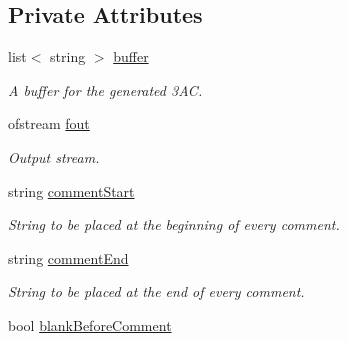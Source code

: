 \subsection*{Private Attributes}
\begin{DoxyCompactItemize}
\item 
\hypertarget{classTAC__Generator_ac81f61474c8fd2da0b4806f81719356a}{list$<$ string $>$ \hyperlink{classTAC__Generator_ac81f61474c8fd2da0b4806f81719356a}{buffer}}\label{classTAC__Generator_ac81f61474c8fd2da0b4806f81719356a}

\begin{DoxyCompactList}\small\item\em A buffer for the generated 3\-A\-C. \end{DoxyCompactList}\item 
\hypertarget{classTAC__Generator_a28ca6d057dca0033a4ae6e67b903ea7c}{ofstream \hyperlink{classTAC__Generator_a28ca6d057dca0033a4ae6e67b903ea7c}{fout}}\label{classTAC__Generator_a28ca6d057dca0033a4ae6e67b903ea7c}

\begin{DoxyCompactList}\small\item\em Output stream. \end{DoxyCompactList}\item 
\hypertarget{classTAC__Generator_ac530666b410f226e764e9eb33b2a4666}{string \hyperlink{classTAC__Generator_ac530666b410f226e764e9eb33b2a4666}{comment\-Start}}\label{classTAC__Generator_ac530666b410f226e764e9eb33b2a4666}

\begin{DoxyCompactList}\small\item\em String to be placed at the beginning of every comment. \end{DoxyCompactList}\item 
\hypertarget{classTAC__Generator_a9f011cfb810ea2cd01b31b9a48762123}{string \hyperlink{classTAC__Generator_a9f011cfb810ea2cd01b31b9a48762123}{comment\-End}}\label{classTAC__Generator_a9f011cfb810ea2cd01b31b9a48762123}

\begin{DoxyCompactList}\small\item\em String to be placed at the end of every comment. \end{DoxyCompactList}\item 
\hypertarget{classTAC__Generator_a56e2e1cedb94e46da20203a1baa8c623}{bool \hyperlink{classTAC__Generator_a56e2e1cedb94e46da20203a1baa8c623}{blank\-Before\-Comment}}\label{classTAC__Generator_a56e2e1cedb94e46da20203a1baa8c623}


\end{DoxyCompactItemize}
